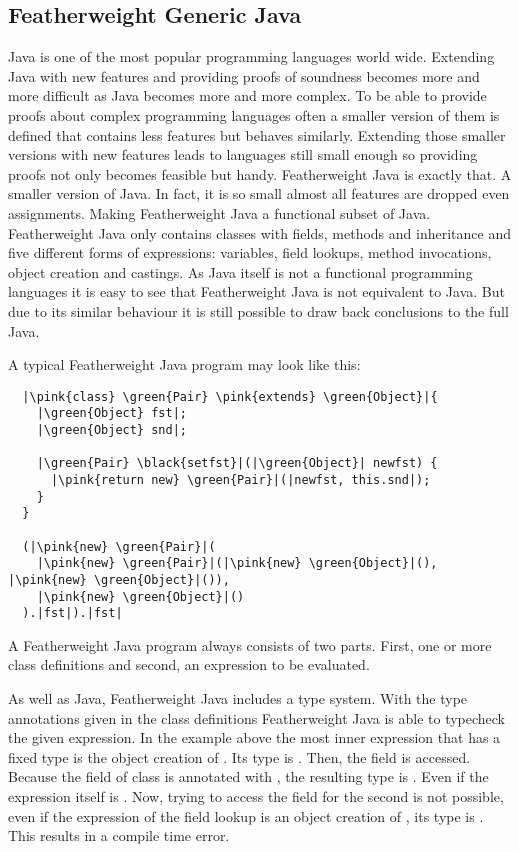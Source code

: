 \subsection{Featherweight Generic Java}
Java is one of the most popular programming languages world wide. Extending Java with new features and providing proofs of soundness becomes more and more difficult as Java becomes more and more complex.
To be able to provide proofs about complex programming languages often a smaller version of them is defined that contains less features but behaves similarly.
Extending those smaller versions with new features leads to languages still small enough so providing proofs not only becomes feasible but handy.
Featherweight Java is exactly that. A smaller version of Java. In fact, it is so small almost all features are dropped even assignments. Making Featherweight Java a functional subset of Java.
Featherweight Java only contains classes with fields, methods and inheritance and five different forms of expressions: variables, field lookups, method invocations, object creation and castings.
As Java itself is not a functional programming languages it is easy to see that Featherweight Java is not equivalent to Java. But due to its similar behaviour it is still possible to draw back conclusions to the full Java.

A typical Featherweight Java program may look like this:

\begin{verbatim}
  |\pink{class} \green{Pair} \pink{extends} \green{Object}|{
    |\green{Object} fst|;
    |\green{Object} snd|;

    |\green{Pair} \black{setfst}|(|\green{Object}| newfst) {
      |\pink{return new} \green{Pair}|(|newfst, this.snd|);
    }
  }

  (|\pink{new} \green{Pair}|(
    |\pink{new} \green{Pair}|(|\pink{new} \green{Object}|(), |\pink{new} \green{Object}|()),
    |\pink{new} \green{Object}|()
  ).|fst|).|fst|
\end{verbatim}

A Featherweight Java program always consists of two parts. First, one or more class definitions and second, an expression to be evaluated.

As well as Java, Featherweight Java includes a type system. With the type annotations given in the class definitions Featherweight Java is able to typecheck the given expression.
In the example above the most inner expression that has a fixed type is the object creation of . Its type is .
Then, the field  is accessed. Because the field  of class  is annotated with , the resulting type is . Even if the expression itself is .
Now, trying to access the field  for the second is not possible, even if the expression of the field lookup is an object creation of , its type is . This results in a compile time error.

